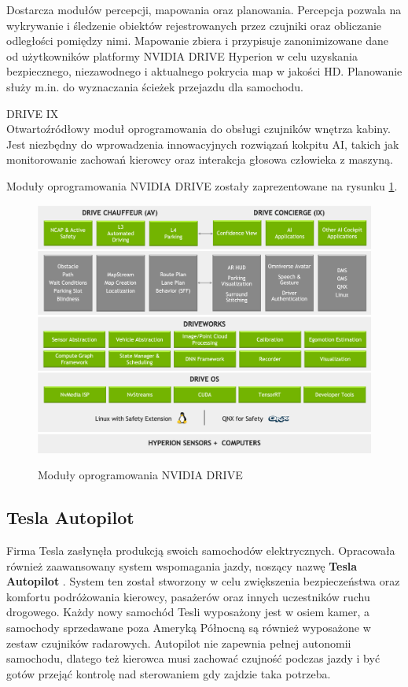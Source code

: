 \begin{enumerate*}
Dostarcza modułów percepcji, mapowania oraz planowania. Percepcja pozwala na wykrywanie i śledzenie obiektów rejestrowanych przez czujniki oraz obliczanie odległości pomiędzy nimi. Mapowanie zbiera i przypisuje zanonimizowane dane od użytkowników platformy NVIDIA DRIVE Hyperion w celu uzyskania bezpiecznego, niezawodnego i aktualnego pokrycia map w jakości HD. Planowanie służy m.in. do wyznaczania ścieżek przejazdu dla samochodu.
\item DRIVE IX \\
Otwartoźródłowy moduł oprogramowania do obsługi czujników wnętrza kabiny. Jest niezbędny do wprowadzenia innowacyjnych rozwiązań kokpitu AI, takich jak monitorowanie zachowań kierowcy oraz interakcja głosowa człowieka z maszyną.
\end{enumerate*}
Moduły oprogramowania NVIDIA DRIVE zostały zaprezentowane na rysunku \ref{NvidiaDriveSDK}.
\newpage
\begin{figure}[h]
\begin{center}
\includegraphics[width=15cm]{resources/figures/nv-drive-sdk.png}
\caption{Moduły oprogramowania NVIDIA DRIVE}
\label{NvidiaDriveSDK}
\end{center}
\end{figure}

\vspace{-0.5cm}
\subsection{Tesla Autopilot}
Firma Tesla zasłynęła produkcją swoich samochodów elektrycznych. Opracowała również zaawansowany system wspomagania jazdy, noszący nazwę \textbf{Tesla Autopilot} \cite{tesla:autopilotOverview}. System ten został stworzony w celu zwiększenia bezpieczeństwa oraz komfortu podróżowania kierowcy, pasażerów oraz innych uczestników ruchu drogowego. Każdy nowy samochód Tesli wyposażony jest w osiem kamer, a samochody sprzedawane poza Ameryką Północną są również wyposażone w zestaw czujników radarowych. Autopilot nie zapewnia pełnej autonomii samochodu, dlatego też kierowca musi zachować czujność podczas jazdy i być gotów przejąć kontrolę nad sterowaniem gdy zajdzie taka potrzeba.

